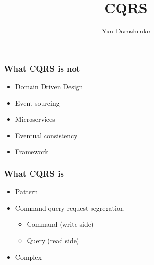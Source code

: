 \documentclass{beamer}
\title[CQRS]{CQRS}
\author[Yan Doroshenko]{Yan Doroshenko}
\begin{document}
\frame{\titlepage}

\begin{frame}
\frametitle{What CQRS is not}

\begin{itemize}
 \item<1-> Domain Driven Design
 \item<2-> Event sourcing
 \item<3-> Microservices
 \item<4-> Eventual consistency
 \item<5-> Framework
\end{itemize}

\end{frame}

\begin{frame}
\frametitle{What CQRS is}

\begin{itemize}
 \item<1-> Pattern
 \item<2-> Command-query request segregation
    \begin{itemize}
         \item<3-> Command (write side)
         \item<4-> Query (read side)
    \end{itemize}
 \item<5-> Complex
\end{itemize}

\end{frame}
\end{document}
